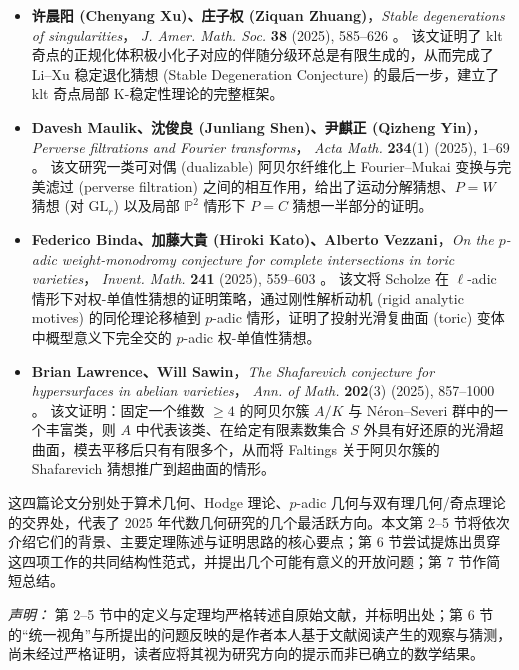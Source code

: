 \documentclass[11pt,a4paper]{article}
\theoremstyle{definition}
\theoremstyle{remark}
\begin{document}
\begin{itemize}[leftmargin=1.6em]
  \item \textbf{许晨阳 (Chenyang Xu)、庄子权 (Ziquan Zhuang)}，\emph{Stable degenerations of singularities}，
  \emph{J. Amer. Math. Soc.} \textbf{38} (2025), 585--626 \cite{XZ2025}。
  该文证明了 klt 奇点的正规化体积极小化子对应的伴随分级环总是有限生成的，从而完成了 Li--Xu 稳定退化猜想 (Stable Degeneration Conjecture) 的最后一步，建立了 klt 奇点局部 K-稳定性理论的完整框架。

  \item \textbf{Davesh Maulik、沈俊良 (Junliang Shen)、尹麒正 (Qizheng Yin)}，\emph{Perverse filtrations and Fourier transforms}，
  \emph{Acta Math.} \textbf{234}(1) (2025), 1--69 \cite{MSY2025}。
  该文研究一类可对偶 (dualizable) 阿贝尔纤维化上 Fourier--Mukai 变换与完美滤过 (perverse filtration) 之间的相互作用，给出了运动分解猜想、$P=W$ 猜想 (对 $\mathrm{GL}_r$) 以及局部 $\mathbb{P}^2$ 情形下 $P=C$ 猜想一半部分的证明。

  \item \textbf{Federico Binda、加藤大貴 (Hiroki Kato)、Alberto Vezzani}，\emph{On the $p$-adic weight-monodromy conjecture for complete intersections in toric varieties}，
  \emph{Invent. Math.} \textbf{241} (2025), 559--603 \cite{BKV2025}。
  该文将 Scholze 在 $\ell$-adic 情形下对权-单值性猜想的证明策略，通过刚性解析动机 (rigid analytic motives) 的同伦理论移植到 $p$-adic 情形，证明了投射光滑复曲面 (toric) 变体中概型意义下完全交的 $p$-adic 权-单值性猜想。

  \item \textbf{Brian Lawrence、Will Sawin}，\emph{The Shafarevich conjecture for hypersurfaces in abelian varieties}，
  \emph{Ann. of Math.} \textbf{202}(3) (2025), 857--1000 \cite{LS2025}。
  该文证明：固定一个维数 $\ge 4$ 的阿贝尔簇 $A/K$ 与 Néron--Severi 群中的一个丰富类，则 $A$ 中代表该类、在给定有限素数集合 $S$ 外具有好还原的光滑超曲面，模去平移后只有有限多个，从而将 Faltings 关于阿贝尔簇的 Shafarevich 猜想推广到超曲面的情形。
\end{itemize}

这四篇论文分别处于算术几何、Hodge 理论、$p$-adic 几何与双有理几何/奇点理论的交界处，代表了 2025 年代数几何研究的几个最活跃方向。本文第 2--5 节将依次介绍它们的背景、主要定理陈述与证明思路的核心要点；第 6 节尝试提炼出贯穿这四项工作的共同结构性范式，并提出几个可能有意义的开放问题；第 7 节作简短总结。

\emph{声明：} 第 2--5 节中的定义与定理均严格转述自原始文献，并标明出处；第 6 节的“统一视角”与所提出的问题反映的是作者本人基于文献阅读产生的观察与猜测，尚未经过严格证明，读者应将其视为研究方向的提示而非已确立的数学结果。
\end{document}
